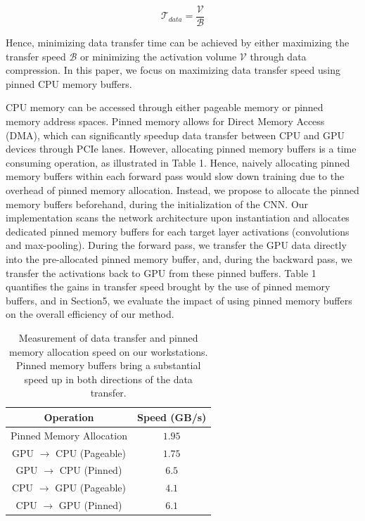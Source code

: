 \documentclass[11pt,onecolumn]{article}
\begin{document}
\begin{equation}
\mathcal{T}_{data} = \frac{\mathcal{V}}{\mathcal{B}}
\end{equation}

Hence, minimizing data transfer time can be achieved by either
maximizing the transfer speed $\mathcal{B}$ or minimizing
the activation volume $\mathcal{V}$ through data compression.
In this paper, we focus on maximizing data transfer speed using pinned
CPU memory buffers.

CPU memory can be accessed through either pageable memory 
or pinned memory address spaces.
Pinned memory allows for Direct Memory Access (DMA), 
which can significantly speedup data transfer between CPU and GPU devices through PCIe lanes.
However, allocating pinned memory buffers is a time consuming operation, as illustrated in Table 1.
Hence, naively allocating pinned memory buffers within each forward pass would
slow down training due to the overhead of pinned memory allocation.
Instead, we propose to allocate the pinned memory buffers beforehand, 
during the initialization of the CNN.
Our implementation scans the network architecture upon instantiation
and allocates dedicated pinned memory buffers for each 
target layer activations (convolutions and max-pooling). 
During the forward pass, we transfer the GPU data directly into the pre-allocated pinned memory buffer,
and, during the backward pass, we transfer the activations back to GPU from these pinned buffers.
Table 1 quantifies the gains in transfer speed brought by the use of pinned memory buffers, and in Section5, we evaluate the impact of using pinned memory buffers on the overall efficiency of our method.

\begin{table}[t]
\begin{center}
\begin{tabular}{ c c }	
\hline
Operation     & Speed (GB/s)  \\
\hline
Pinned Memory Allocation     		&  $1.95$        \\
GPU $\rightarrow$ CPU (Pageable)	&  $1.75$        \\
GPU $\rightarrow$ CPU (Pinned)	        &  $6.5$          \\
CPU $\rightarrow$ GPU (Pageable)	&  $4.1$          \\
CPU $\rightarrow$ GPU (Pinned)	        &  $6.1$          \\
\hline
\end{tabular}
\caption{Measurement of data transfer and pinned memory allocation speed on our workstations.
Pinned memory buffers bring a substantial speed up in both directions of the data transfer.}
\end{center}
\end{table}
\end{document}
